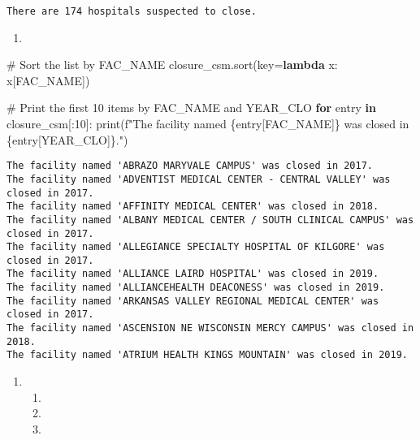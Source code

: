\documentclass[
  letterpaper,
  DIV=11,
  numbers=noendperiod]{scrartcl}
\newenvironment{Shaded}{\begin{snugshade}}{\end{snugshade}}
\newcommand{\BuiltInTok}[1]{\textcolor[rgb]{0.00,0.23,0.31}{#1}}
\newcommand{\CommentTok}[1]{\textcolor[rgb]{0.37,0.37,0.37}{#1}}
\newcommand{\ControlFlowTok}[1]{\textcolor[rgb]{0.00,0.23,0.31}{\textbf{#1}}}
\newcommand{\DecValTok}[1]{\textcolor[rgb]{0.68,0.00,0.00}{#1}}
\newcommand{\KeywordTok}[1]{\textcolor[rgb]{0.00,0.23,0.31}{\textbf{#1}}}
\newcommand{\NormalTok}[1]{\textcolor[rgb]{0.00,0.23,0.31}{#1}}
\newcommand{\OperatorTok}[1]{\textcolor[rgb]{0.37,0.37,0.37}{#1}}
\newcommand{\SpecialCharTok}[1]{\textcolor[rgb]{0.37,0.37,0.37}{#1}}
\newcommand{\SpecialStringTok}[1]{\textcolor[rgb]{0.13,0.47,0.30}{#1}}
\newcommand{\StringTok}[1]{\textcolor[rgb]{0.13,0.47,0.30}{#1}}
\providecommand{\tightlist}{%
  \setlength{\itemsep}{0pt}\setlength{\parskip}{0pt}}\usepackage{longtable,booktabs,array}
\begin{document}
\begin{verbatim}
There are 174 hospitals suspected to close.
\end{verbatim}

\begin{enumerate}
\def\labelenumi{\arabic{enumi}.}
\setcounter{enumi}{1}
\tightlist
\item
\end{enumerate}

\begin{Shaded}
\begin{Highlighting}[]
\CommentTok{\# Sort the list by \textquotesingle{}FAC\_NAME\textquotesingle{}}
\NormalTok{closure\_csm.sort(key}\OperatorTok{=}\KeywordTok{lambda}\NormalTok{ x: x[}\StringTok{\textquotesingle{}FAC\_NAME\textquotesingle{}}\NormalTok{])}

\CommentTok{\# Print the first 10 items by \textquotesingle{}FAC\_NAME\textquotesingle{} and \textquotesingle{}YEAR\_CLO\textquotesingle{}}
\ControlFlowTok{for}\NormalTok{ entry }\KeywordTok{in}\NormalTok{ closure\_csm[:}\DecValTok{10}\NormalTok{]:}
    \BuiltInTok{print}\NormalTok{(}\SpecialStringTok{f"The facility named \textquotesingle{}}\SpecialCharTok{\{}\NormalTok{entry[}\StringTok{\textquotesingle{}FAC\_NAME\textquotesingle{}}\NormalTok{]}\SpecialCharTok{\}}\SpecialStringTok{\textquotesingle{} was closed in }\SpecialCharTok{\{}\NormalTok{entry[}\StringTok{\textquotesingle{}YEAR\_CLO\textquotesingle{}}\NormalTok{]}\SpecialCharTok{\}}\SpecialStringTok{."}\NormalTok{)}
\end{Highlighting}
\end{Shaded}

\begin{verbatim}
The facility named 'ABRAZO MARYVALE CAMPUS' was closed in 2017.
The facility named 'ADVENTIST MEDICAL CENTER - CENTRAL VALLEY' was closed in 2017.
The facility named 'AFFINITY MEDICAL CENTER' was closed in 2018.
The facility named 'ALBANY MEDICAL CENTER / SOUTH CLINICAL CAMPUS' was closed in 2017.
The facility named 'ALLEGIANCE SPECIALTY HOSPITAL OF KILGORE' was closed in 2017.
The facility named 'ALLIANCE LAIRD HOSPITAL' was closed in 2019.
The facility named 'ALLIANCEHEALTH DEACONESS' was closed in 2019.
The facility named 'ARKANSAS VALLEY REGIONAL MEDICAL CENTER' was closed in 2017.
The facility named 'ASCENSION NE WISCONSIN MERCY CAMPUS' was closed in 2018.
The facility named 'ATRIUM HEALTH KINGS MOUNTAIN' was closed in 2019.
\end{verbatim}

\begin{enumerate}
\def\labelenumi{\arabic{enumi}.}
\setcounter{enumi}{2}
\tightlist
\item
  \begin{enumerate}
  \def\labelenumii{\alph{enumii}.}
  \tightlist
  \item
  \item
  \item
  \end{enumerate}
\end{enumerate}
\end{document}
